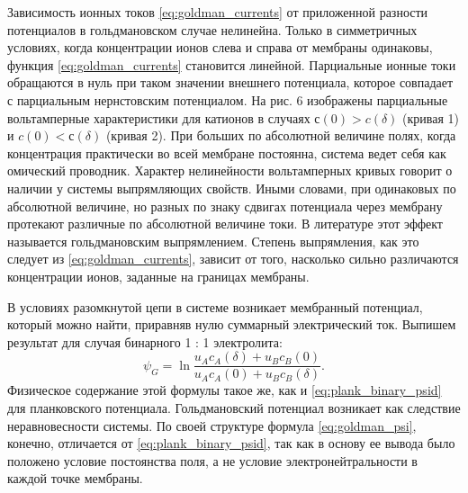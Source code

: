 Зависимость ионных токов \eqref{eq:goldman_currents} от приложенной разности
потенциалов в гольдмановском случае нелинейна. Только в симметричных условиях,
когда концентрации ионов слева и справа от мембраны одинаковы, функция
\eqref{eq:goldman_currents} становится линейной. Парциальные ионные токи
обращаются в нуль при таком значении внешнего потенциала, которое совпадает с
парциальным нернстовским потенциалом. На рис. 6 изображены парциальные
вольтамперные характеристики для катионов в случаях \( с(0) > c(\delta) \)
(кривая 1) и \( c(0) < с (\delta) \) (кривая 2). При больших по абсолютной
величине полях, когда концентрация практически во всей мембране постоянна,
система ведет себя как омический проводник. Характер нелинейности вольтамперных
кривых говорит о наличии у системы выпрямляющих свойств. Иными словами, при
одинаковых по абсолютной величине, но разных по знаку сдвигах потенциала через
мембрану протекают различные по абсолютной величине токи. В литературе этот
эффект называется гольдмановским выпрямлением. Степень выпрямления, как это
следует из \eqref{eq:goldman_currents}, зависит от того, насколько сильно
различаются концентрации ионов, заданные на границах мембраны.

В условиях разомкнутой цепи в системе возникает мембранный потенциал, который
можно найти, приравняв нулю суммарный электрический ток. Выпишем результат для
случая бинарного 1 : 1 электролита:
\begin{equation}
    \psi_G =
        \ln\frac{u_A c_A(\delta) + u_B c_B(0)}{u_A c_A(0) + u_B c_B(\delta)}.
    \label{eq:goldman_psi}
\end{equation}
Физическое содержание этой формулы такое же, как и \eqref{eq:plank_binary_psid}
для планковского потенциала. Гольдмановский потенциал возникает как следствие
неравновесности системы. По своей структуре формула \eqref{eq:goldman_psi},
конечно, отличается от \eqref{eq:plank_binary_psid}, так как в основу ее вывода
было положено условие постоянства поля, а не условие электронейтральности в
каждой точке мембраны.

